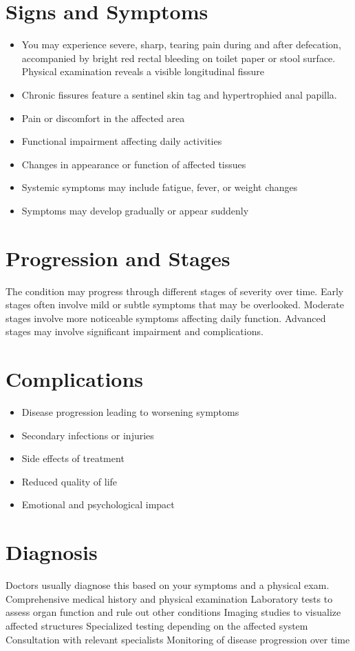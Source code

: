 \section{Signs and Symptoms}
\begin{itemize}[noitemsep]
  \item You may experience severe, sharp, tearing pain during and after defecation, accompanied by bright red rectal bleeding on toilet paper or stool surface. Physical examination reveals a visible longitudinal fissure
  \item Chronic fissures feature a sentinel skin tag and hypertrophied anal papilla.
  \item Pain or discomfort in the affected area
  \item Functional impairment affecting daily activities
  \item Changes in appearance or function of affected tissues
  \item Systemic symptoms may include fatigue, fever, or weight changes
  \item Symptoms may develop gradually or appear suddenly
\end{itemize}
\section{Progression and Stages}
The condition may progress through different stages of severity over time. Early stages often involve mild or subtle symptoms that may be overlooked. Moderate stages involve more noticeable symptoms affecting daily function. Advanced stages may involve significant impairment and complications.
\section{Complications}
\begin{itemize}[noitemsep]
  \item Disease progression leading to worsening symptoms
  \item Secondary infections or injuries
  \item Side effects of treatment
  \item Reduced quality of life
  \item Emotional and psychological impact
\end{itemize}
\section{Diagnosis}
Doctors usually diagnose this based on your symptoms and a physical exam. Comprehensive medical history and physical examination Laboratory tests to assess organ function and rule out other conditions Imaging studies to visualize affected structures Specialized testing depending on the affected system Consultation with relevant specialists Monitoring of disease progression over time

